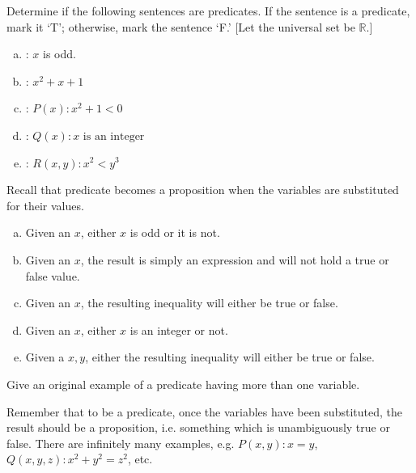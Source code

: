 \documentclass[11pt,letterpaper]{article}
\begin{document}

 Determine if the following sentences are predicates. If the sentence is a predicate, mark it `T'; otherwise, mark the sentence `F.' [Let the universal set be $\mathbb{R}$.]
	\begin{enumerate}[(a)]
	\item {}: $x$ is odd.
	\item {}: $x^2 + x + 1$
	\item {}: $P(x) \colon x^2 + 1 < 0$
	\item {}: $Q(x) \colon x \text{ is an integer}$
	\item {}: $R(x, y) \colon x^2 < y^3$
	\end{enumerate} \pspace

\sol Recall that predicate becomes a proposition when the variables are substituted for their values. 
\begin{enumerate}[(a)]
\item Given an $x$, either $x$ is odd or it is not. 

\item Given an $x$, the result is simply an expression and will not hold a true or false value. 

\item Given an $x$, the resulting inequality will either be true or false. 

\item Given an $x$, either $x$ is an integer or not. 

\item Given a $x, y$, either the resulting inequality will either be true or false. 
\end{enumerate}





\newpage




	
 Give an original example of a predicate having more than one variable.

\sol Remember that to be a predicate, once the variables have been substituted, the result should be a proposition, i.e. something which is unambiguously true or false. There are infinitely many examples, e.g. $P(x,y) \colon x = y$, $Q(x,y,z) \colon x^2 + y^2= z^2$, etc. 
\end{document}

